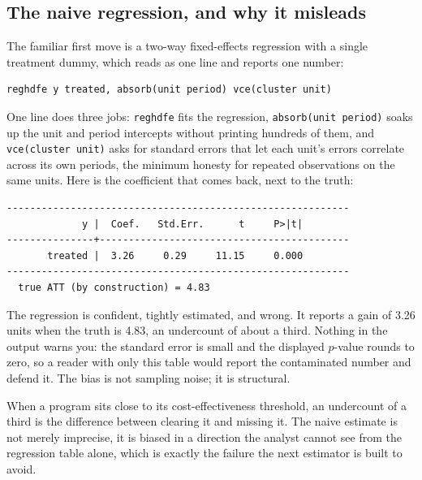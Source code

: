 \subsection{The naive regression, and why it misleads}
The familiar first move is a two-way fixed-effects regression with a single treatment dummy, which reads as one line and reports one number:
\par
{\footnotesize
\begin{verbatim}
reghdfe y treated, absorb(unit period) vce(cluster unit)
\end{verbatim}
}
One line does three jobs: \texttt{reghdfe} fits the regression, \texttt{absorb(unit period)} soaks up the unit and period intercepts without printing hundreds of them, and \texttt{vce(cluster unit)} asks for standard errors that let each unit's errors correlate across its own periods, the minimum honesty for repeated observations on the same units. Here is the coefficient that comes back, next to the truth:
\par
{\footnotesize
\begin{verbatim}
-----------------------------------------------------------
             y |  Coef.   Std.Err.      t     P>|t|
---------------+-------------------------------------------
       treated |  3.26     0.29     11.15     0.000
-----------------------------------------------------------
  true ATT (by construction) = 4.83
\end{verbatim}
}
The regression is confident, tightly estimated, and wrong. It reports a gain of 3.26 units when the truth is 4.83, an undercount of about a third. Nothing in the output warns you: the standard error is small and the displayed $p$-value rounds to zero, so a reader with only this table would report the contaminated number and defend it. The bias is not sampling noise; it is structural.

When a program sits close to its cost-effectiveness threshold, an undercount of a third is the difference between clearing it and missing it. The naive estimate is not merely imprecise, it is biased in a direction the analyst cannot see from the regression table alone, which is exactly the failure the next estimator is built to avoid.

